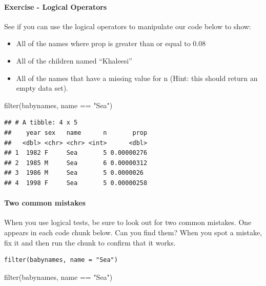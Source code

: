 \documentclass[
]{article}
\newenvironment{Shaded}{\begin{snugshade}}{\end{snugshade}}
\newcommand{\FunctionTok}[1]{\textcolor[rgb]{0.00,0.00,0.00}{#1}}
\newcommand{\NormalTok}[1]{#1}
\newcommand{\SpecialCharTok}[1]{\textcolor[rgb]{0.00,0.00,0.00}{#1}}
\newcommand{\StringTok}[1]{\textcolor[rgb]{0.31,0.60,0.02}{#1}}
\providecommand{\tightlist}{%
  \setlength{\itemsep}{0pt}\setlength{\parskip}{0pt}}
\begin{document}
\hypertarget{exercise---logical-operators}{%
\paragraph{Exercise - Logical
Operators}\label{exercise---logical-operators}}

See if you can use the logical operators to manipulate our code below to
show:

\begin{itemize}
\tightlist
\item
  All of the names where prop is greater than or equal to 0.08
\item
  All of the children named ``Khaleesi''
\item
  All of the names that have a missing value for n (Hint: this should
  return an empty data set).
\end{itemize}

\begin{Shaded}
\begin{Highlighting}[]
\FunctionTok{filter}\NormalTok{(babynames, name }\SpecialCharTok{==} \StringTok{"Sea"}\NormalTok{)}
\end{Highlighting}
\end{Shaded}

\begin{verbatim}
## # A tibble: 4 x 5
##    year sex   name      n       prop
##   <dbl> <chr> <chr> <int>      <dbl>
## 1  1982 F     Sea       5 0.00000276
## 2  1985 M     Sea       6 0.00000312
## 3  1986 M     Sea       5 0.0000026 
## 4  1998 F     Sea       5 0.00000258
\end{verbatim}

\hypertarget{two-common-mistakes}{%
\paragraph{Two common mistakes}\label{two-common-mistakes}}

When you use logical tests, be sure to look out for two common mistakes.
One appears in each code chunk below. Can you find them? When you spot a
mistake, fix it and then run the chunk to confirm that it works.

\begin{verbatim}
filter(babynames, name = "Sea")
\end{verbatim}

\begin{Shaded}
\begin{Highlighting}[]
\FunctionTok{filter}\NormalTok{(babynames, name }\SpecialCharTok{==} \StringTok{"Sea"}\NormalTok{)}
\end{Highlighting}
\end{Shaded}
\end{document}
